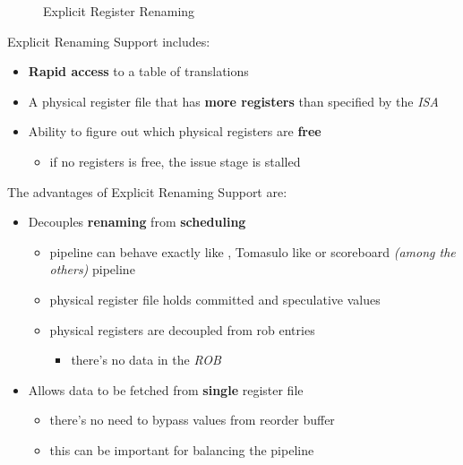 \documentclass[english]{article}
\begin{document}
\begin{figure}[htbp]
  \bigskip
  \centering
  \caption{Explicit Register Renaming}
  \label{fig:explicit-register-renaming}
  \bigskip
\end{figure}

Explicit Renaming Support includes:

\begin{itemize}
  \item \textbf{Rapid access} to a table of translations
  \item A physical register file that has \textbf{more registers} than specified by the \textit{ISA}
  \item Ability to figure out which physical registers are \textbf{free}
        \begin{itemize}
          \item if no registers is free, the issue stage is stalled
        \end{itemize}
\end{itemize}

The advantages of Explicit Renaming Support are:

\begin{itemize}
  \item Decouples \textbf{renaming} from \textbf{scheduling}
        \begin{itemize}
          \item pipeline can behave exactly like , Tomasulo like or scoreboard \textit{(among the others)} pipeline
          \item physical register file holds committed and speculative values
          \item physical registers are decoupled from rob entries
                \begin{itemize}
                  \item there's no data in the \textit{ROB}
                \end{itemize}
        \end{itemize}
  \item Allows data to be fetched from \textbf{single} register file
        \begin{itemize}
          \item there's no need to bypass values from reorder buffer
          \item this  can be important for balancing the pipeline
        \end{itemize}
\end{itemize}
\end{document}
